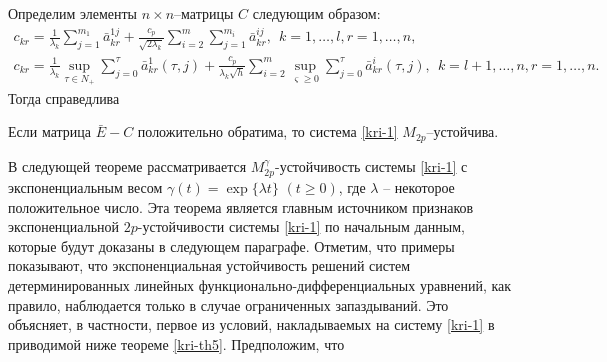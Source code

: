 Определим  элементы $n\times n$--матрицы $C$ следующим образом:
$$
\begin{array}{crl}
c_{kr} = \frac{1}{\lambda _k}\sum \limits_{j=1}^{m_1} \bar
a^{1j}_{kr} + \frac{c_p}{\sqrt{2\lambda _k}} \sum \limits_{i=2}^m
\sum \limits_{j=1}^{m_i} \bar a^{ij}_{kr}, \ \  k
= 1, \dots ,l, r = 1, \dots, n,\\
c_{kr} = \frac{1}{\lambda _k}\mathrel {\mathop {\sup}  \limits
_{\tau \in N_+ }} \sum \limits _{j=0 }^{\tau}\bar a^{1}_{kr}(\tau,j)
+ \frac{c_p}{\lambda _k\sqrt{h}} \sum \limits _{i=2}^{m}\mathrel
{\mathop {\sup}  \limits _{\varsigma \geq 0 }} \sum \limits _{j=0
}^{\tau} \bar a^{i}_{kr}(\tau,j), \ \ k = l+1, \dots,n, r = 1, \dots, n.
\end{array}
$$
Тогда справедлива

\begin{theorem}\label{kri-th4} Если матрица $\bar E - C$ положительно
обратима, то система \eqref{kri-1} $M_{2p}$--устой\-чи\-ва.
\end{theorem}

В следующей теореме рассматривается $M_{2p}^\gamma $-устойчивость
системы \eqref{kri-1} с экспоненциальным весом $\gamma (t) = \exp \{\lambda
t\} \,\, (t \geq 0)$, где $\lambda$ --  некоторое  положительное
число. Эта теорема является главным источником признаков
экспоненциальной $2p$-устойчивости системы \eqref{kri-1} по начальным данным,
которые будут доказаны в следующем параграфе. Отметим, что примеры
показывают, что экспоненциальная устойчивость решений систем
детерминированных линейных функционально-дифференциальных уравнений,
как правило,  наблюдается только в случае ограниченных запаздываний.
Это объясняет, в частности, первое из условий, накладываемых на
систему \eqref{kri-1} в приводимой ниже теореме \ref{kri-th5}. Предположим, что

